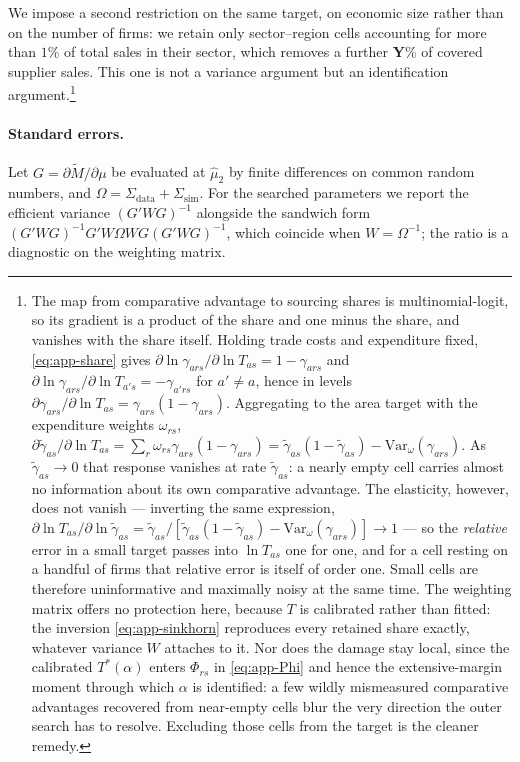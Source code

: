 We impose a second restriction on the same target, on economic size rather than on the number of
firms: we retain only sector--region cells accounting for more than $1\%$ of total sales in their
sector, which removes a further \textbf{Y}\% of covered supplier sales. This one is not a
variance argument but an identification argument.\footnote{The map from comparative advantage to
sourcing shares is multinomial-logit, so its gradient is a product of the share and one minus the
share, and vanishes with the share itself. Holding trade costs and expenditure fixed,
\eqref{eq:app-share} gives $\partial\ln\gamma_{ars}/\partial\ln T_{as}=1-\gamma_{ars}$ and
$\partial\ln\gamma_{ars}/\partial\ln T_{a's}=-\gamma_{a'rs}$ for $a'\neq a$, hence in levels
$\partial\gamma_{ars}/\partial\ln T_{as}=\gamma_{ars}(1-\gamma_{ars})$. Aggregating to the area
target with the expenditure weights $\omega_{rs}$,
$\partial\tilde\gamma_{as}/\partial\ln T_{as}=\sum_{r}\omega_{rs}\gamma_{ars}(1-\gamma_{ars})
=\tilde\gamma_{as}(1-\tilde\gamma_{as})-\mathrm{Var}_{\omega}(\gamma_{ars})$. As
$\tilde\gamma_{as}\to0$ that response vanishes at rate $\tilde\gamma_{as}$: a nearly empty cell
carries almost no information about its own comparative advantage. The elasticity, however, does
not vanish --- inverting the same expression,
$\partial\ln T_{as}/\partial\ln\tilde\gamma_{as}
=\tilde\gamma_{as}/[\tilde\gamma_{as}(1-\tilde\gamma_{as})-\mathrm{Var}_{\omega}(\gamma_{ars})]\to1$
--- so the \emph{relative} error in a small target passes into $\ln T_{as}$ one for one, and for a
cell resting on a handful of firms that relative error is itself of order one. Small cells are
therefore uninformative and maximally noisy at the same time. The weighting matrix offers no
protection here, because $T$ is calibrated rather than fitted: the inversion
\eqref{eq:app-sinkhorn} reproduces every retained share exactly, whatever variance $W$ attaches
to it. Nor does the damage stay local, since the calibrated $T^{*}(\alpha)$ enters $\Phi_{rs}$ in
\eqref{eq:app-Phi} and hence the extensive-margin moment through which $\alpha$ is identified: a
few wildly mismeasured comparative advantages recovered from near-empty cells blur the very
direction the outer search has to resolve. Excluding those cells from the target is the cleaner
remedy.}

\paragraph{Standard errors.} Let $G=\partial\tilde M/\partial\mu$ be evaluated at $\hat\mu_{2}$
by finite differences on common random numbers, and $\Omega=\Sigma_{\mathrm{data}}+\Sigma_{\mathrm{sim}}$.
For the searched parameters we report the efficient variance $(G'WG)^{-1}$ alongside the sandwich
form $(G'WG)^{-1}G'W\Omega WG(G'WG)^{-1}$, which coincide when $W=\Omega^{-1}$; the ratio is a
diagnostic on the weighting matrix.


